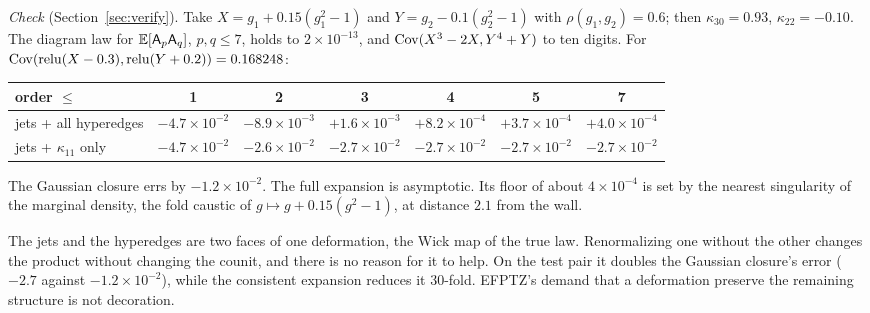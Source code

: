 \emph{Check} (Section~\ref{sec:verify}). Take $X=g_1+0.15(g_1^2-1)$ and $Y=g_2-0.1(g_2^2-1)$ with $\rho(g_1,g_2)=0.6$; then $\kappa_{30}=0.93$,
$\kappa_{22}=-0.10$. The diagram law for $\mathbb E[\mathsf A_p\mathsf A_q]$, $p,q\le7$, holds to $2\times10^{-13}$, and $\operatorname{Cov}(X^3-2X,Y^4+Y)$ to ten digits. For
$\operatorname{Cov}(\operatorname{relu}(X-0.3),\operatorname{relu}(Y+0.2))=0.168248$:
\begin{center}\footnotesize\setlength{\tabcolsep}{3pt}
\begin{tabular}{lcccccc}\toprule
order $\le$ & 1 & 2 & 3 & 4 & 5 & 7\\\midrule
jets + all hyperedges & $-4.7\times10^{-2}$ & $-8.9\times10^{-3}$ & $+1.6\times10^{-3}$ & $+8.2\times10^{-4}$ & $+3.7\times10^{-4}$ & $+4.0\times10^{-4}$\\
jets + $\kappa_{11}$ only & $-4.7\times10^{-2}$ & $-2.6\times10^{-2}$ & $-2.7\times10^{-2}$ & $-2.7\times10^{-2}$ & $-2.7\times10^{-2}$ & $-2.7\times10^{-2}$\\\bottomrule
\end{tabular}
\end{center}
The Gaussian closure errs by $-1.2\times10^{-2}$. The full expansion is asymptotic. Its floor of about $4\times10^{-4}$ is set by the nearest
singularity of the marginal density, the fold caustic of $g\mapsto g+0.15(g^2-1)$, at distance $2.1$ from the wall.

\begin{corollary}\label{cor:consistency}
The jets and the hyperedges are two faces of one deformation, the Wick map of the true law. Renormalizing one without the other changes
the product without changing the counit, and there is no reason for it to help. On the test pair it doubles the Gaussian closure's
error ($-2.7$ against $-1.2\times10^{-2}$), while the consistent expansion reduces it $30$-fold. EFPTZ's demand that a deformation preserve
the remaining structure is not decoration.
\end{corollary}

